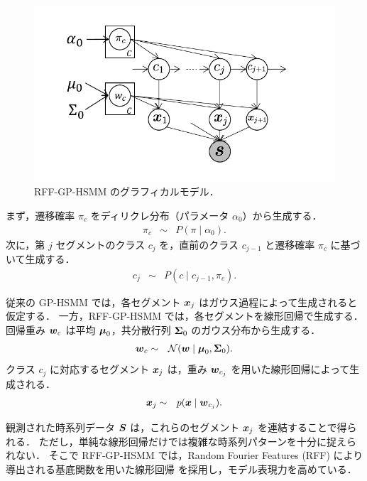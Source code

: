 \documentclass[conference]{IEEEtran}
\begin{document}
\begin{figure}[t]
  \begin{center}
    \includegraphics[scale=0.6]{fig/model.pdf}
    \caption{RFF-GP-HSMM のグラフィカルモデル．}
    \label{fig:model}
  \end{center}
  \vspace{-0.4cm}
\end{figure}

まず，遷移確率 $\pi_c$ をディリクレ分布（パラメータ $\alpha_0$）から生成する．
%
\begin{eqnarray}
\pi_c &\sim& P(\pi \mid \alpha_0).
\end{eqnarray}
%
次に，第 $j$ セグメントのクラス $c_j$ を，直前のクラス $c_{j-1}$ と遷移確率 $\pi_c$ に基づいて生成する．
%
\begin{eqnarray}
c_j &\sim& P(c \mid c_{j-1}, \pi_c).
\end{eqnarray}
%

従来の GP-HSMM では，各セグメント ${ \boldsymbol x}_j$ はガウス過程によって生成されると仮定する．  
一方，RFF-GP-HSMM では，各セグメントを線形回帰で生成する．  
回帰重み ${ \boldsymbol w}_c$ は平均 ${\boldsymbol\mu}_0$，共分散行列 ${\boldsymbol\Sigma}_0$ のガウス分布から生成する．
%
\begin{eqnarray}
{ \boldsymbol w}_c &\sim& \mathcal{N}({ \boldsymbol w} \mid {\boldsymbol\mu}_0, {\boldsymbol\Sigma}_0).
\end{eqnarray}
%
クラス $c_j$ に対応するセグメント ${ \boldsymbol x}_j$ は，重み ${ \boldsymbol w}_{c_j}$ を用いた線形回帰によって生成される．
%
\begin{eqnarray}
{ \boldsymbol x}_j &\sim& p({ \boldsymbol x} \mid { \boldsymbol w}_{c_j}).
\end{eqnarray}

観測された時系列データ ${ \boldsymbol S}$ は，これらのセグメント ${ \boldsymbol x}_j$ を連結することで得られる．  
ただし，単純な線形回帰だけでは複雑な時系列パターンを十分に捉えられない．  
そこで RFF-GP-HSMM では，Random Fourier Features (RFF) により導出される基底関数を用いた線形回帰\cite{Rahimi2007} を採用し，モデル表現力を高めている．
\end{document}

